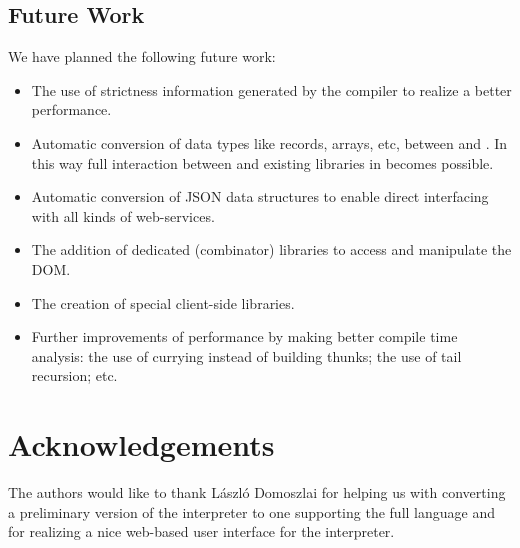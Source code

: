 \subsection{Future Work}
We have planned the following future work:
\begin{itemize}
\item The use of strictness information generated by the \Clean compiler to realize a better performance.
\item Automatic conversion of data types like records, arrays, etc, between \Sapl and \JS. 
In this way full interaction between \Sapl and existing libraries in \JS becomes possible.
\item Automatic conversion of \textsf{JSON} data structures  to enable direct interfacing with all kinds of web-services. 
\item The addition of dedicated (combinator) libraries to access and manipulate the \Html \textsf{DOM}.
\item The creation of special client-side \iTask libraries.
\item Further improvements of performance by making better compile time analysis: the use of \JS currying instead of building thunks;
the use of tail recursion; etc.
\end{itemize}

\section*{Acknowledgements}
The authors would like to thank L\'aszl\'o Domoszlai for helping us with converting a preliminary version of the interpreter 
to one supporting the full \Sapl language and
for realizing a nice web-based user interface for the interpreter.
